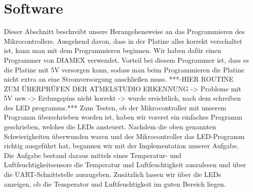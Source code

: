 \documentclass[]{article}
\begin{document}
\section{Software}
Dieser Abschnitt beschreibt unsere Herangehensweise an das Programmieren des Mikrocontrollers. Ausgehend davon, dass in der Platine alles korrekt verschaltet ist, kann man mit dem Programmieren beginnen. Wir haben dafür einen Programmer von DIAMEX verwendet. Vorteil bei diesem Programmer ist, dass es die Platine mit 5V versorgen kann, sodass man beim Programmieren die Platine nicht extra an eine Stromversorgung anschließen muss. 
***-HIER ROUTINE ZUM ÜBERPRÜFEN DER ATMELSTUDIO ERKENNUNG -> Probleme mit 5V usw -> Erdungspins nicht korrekt -> wurde ersichtlich, nach dem schreiben des LED programms.***
Zum Testen, ob der Mikrocontroller mit unserem Programm überschrieben worden ist, haben wir vorerst ein einfaches Programm geschrieben, welches die LEDs ansteuert. Nachdem die oben genannten Schwierigkeiten überwunden waren und der Mikrocontroller das LED-Programm richtig ausgeführt hat, begannen wir mit der Implementation unserer Aufgabe. Die Aufgabe bestand daraus mittels eines Temperatur- und Luftfeuchtigkeitsensors die Temperatur und Luftfeuchtigkeit auszulesen und über die UART-Schnittstelle auszugeben. Zusätzlich lassen wir über die LEDs anzeigen, ob die Temperator und Luftfeuchtigkeit im guten Bereich liegen. 
\end{document}
